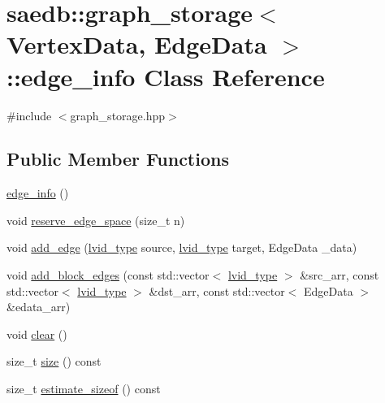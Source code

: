 \hypertarget{classsaedb_1_1graph__storage_1_1edge__info}{\section{saedb\-:\-:graph\-\_\-storage$<$ Vertex\-Data, Edge\-Data $>$\-:\-:edge\-\_\-info Class Reference}
\label{da/d12/classsaedb_1_1graph__storage_1_1edge__info}
}


{\ttfamily \#include $<$graph\-\_\-storage.\-hpp$>$}

\subsection*{Public Member Functions}
\begin{DoxyCompactItemize}
\item 
\hyperlink{classsaedb_1_1graph__storage_1_1edge__info_a105a70a653042dd5e3341b0d7eeab383}{edge\-\_\-info} ()
\item 
void \hyperlink{classsaedb_1_1graph__storage_1_1edge__info_af089914b036b8eeeca35b28caaabb906}{reserve\-\_\-edge\-\_\-space} (size\-\_\-t n)
\item 
void \hyperlink{classsaedb_1_1graph__storage_1_1edge__info_a681508fc5ebfc310761328718603e4e3}{add\-\_\-edge} (\hyperlink{classsaedb_1_1graph__storage_a147a907accd64bb1f803a423d04dd04b}{lvid\-\_\-type} source, \hyperlink{classsaedb_1_1graph__storage_a147a907accd64bb1f803a423d04dd04b}{lvid\-\_\-type} target, Edge\-Data \-\_\-data)
\item 
void \hyperlink{classsaedb_1_1graph__storage_1_1edge__info_a2a2078969581e18c034180dcf1d149ea}{add\-\_\-block\-\_\-edges} (const std\-::vector$<$ \hyperlink{classsaedb_1_1graph__storage_a147a907accd64bb1f803a423d04dd04b}{lvid\-\_\-type} $>$ \&src\-\_\-arr, const std\-::vector$<$ \hyperlink{classsaedb_1_1graph__storage_a147a907accd64bb1f803a423d04dd04b}{lvid\-\_\-type} $>$ \&dst\-\_\-arr, const std\-::vector$<$ Edge\-Data $>$ \&edata\-\_\-arr)
\item 
void \hyperlink{classsaedb_1_1graph__storage_1_1edge__info_a9564399765fda82a7490d4d5db85a141}{clear} ()
\item 
size\-\_\-t \hyperlink{classsaedb_1_1graph__storage_1_1edge__info_aac1190dac0b62b52be9bfaf5f8a7ab3d}{size} () const 
\item 
size\-\_\-t \hyperlink{classsaedb_1_1graph__storage_1_1edge__info_a3d95a79d55d5cb9b4a9ffc20cd0da644}{estimate\-\_\-sizeof} () const 
\end{DoxyCompactItemize}

